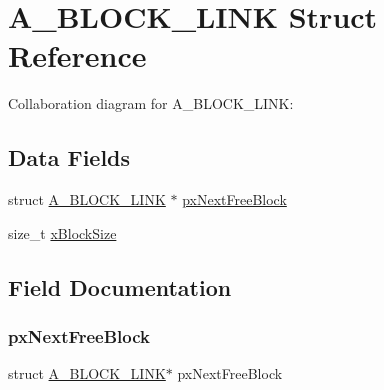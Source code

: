 \hypertarget{struct_a___b_l_o_c_k___l_i_n_k}{}\section{A\+\_\+\+B\+L\+O\+C\+K\+\_\+\+L\+I\+NK Struct Reference}
\label{struct_a___b_l_o_c_k___l_i_n_k}


Collaboration diagram for A\+\_\+\+B\+L\+O\+C\+K\+\_\+\+L\+I\+NK\+:
\subsection*{Data Fields}
\begin{DoxyCompactItemize}
\item 
struct \hyperlink{struct_a___b_l_o_c_k___l_i_n_k}{A\+\_\+\+B\+L\+O\+C\+K\+\_\+\+L\+I\+NK} $\ast$ \hyperlink{struct_a___b_l_o_c_k___l_i_n_k_ae48282896c5b0af5cb25f914f3c1c936}{px\+Next\+Free\+Block}
\item 
size\+\_\+t \hyperlink{struct_a___b_l_o_c_k___l_i_n_k_a130b4f85ad4cc46ca0f3d36001769696}{x\+Block\+Size}
\end{DoxyCompactItemize}


\subsection{Field Documentation}
\mbox{\label{struct_a___b_l_o_c_k___l_i_n_k_ae48282896c5b0af5cb25f914f3c1c936}} 
\subsubsection{\texorpdfstring{px\+Next\+Free\+Block}{pxNextFreeBlock}}
{\footnotesize\ttfamily struct \hyperlink{struct_a___b_l_o_c_k___l_i_n_k}{A\+\_\+\+B\+L\+O\+C\+K\+\_\+\+L\+I\+NK}$\ast$ px\+Next\+Free\+Block}

\mbox{\label{struct_a___b_l_o_c_k___l_i_n_k_a130b4f85ad4cc46ca0f3d36001769696}} 
